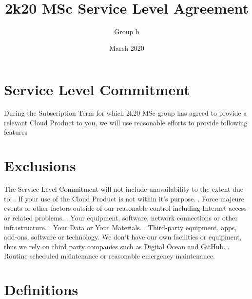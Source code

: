 \documentclass{article}
\title{2k20 MSc Service Level Agreement}
\author{Group b }
\date{March 2020}
\begin{document}
\maketitle

\vskip 1in
\section{Service Level Commitment}

During the Subscription Term for which 2k20 MSc group has agreed to provide a relevant Cloud Product to you, we will use reasonable efforts to provide following features
\vskip 0.2in

\vskip 0.5in

\section{Exclusions}
The Service Level Commitment will not include unavailability to the extent due to: . If your use of the Cloud Product is not within it's purpose. . Force majeure events or other factors outside of our reasonable control including Internet access or related problems. . Your equipment, software, network connections or other infrastructure. . Your Data or Your Materials. . Third-party equipment, apps, add-ons, software or technology. We don't have our own facilities or equipment, thus we rely on third party companies such as Digital Ocean and GitHub. . Routine scheduled maintenance or reasonable emergency maintenance.
\vskip 0.5in

\section{Definitions}
\end{document}
